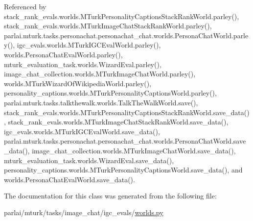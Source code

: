 Referenced by stack\+\_\+rank\+\_\+evals.\+worlds.\+M\+Turk\+Personality\+Captions\+Stack\+Rank\+World.\+parley(), stack\+\_\+rank\+\_\+evals.\+worlds.\+M\+Turk\+Image\+Chat\+Stack\+Rank\+World.\+parley(), parlai.\+mturk.\+tasks.\+personachat.\+personachat\+\_\+chat.\+worlds.\+Persona\+Chat\+World.\+parley(), igc\+\_\+evals.\+worlds.\+M\+Turk\+I\+G\+C\+Eval\+World.\+parley(), worlds.\+Persona\+Chat\+Eval\+World.\+parley(), mturk\+\_\+evaluation\+\_\+task.\+worlds.\+Wizard\+Eval.\+parley(), image\+\_\+chat\+\_\+collection.\+worlds.\+M\+Turk\+Image\+Chat\+World.\+parley(), worlds.\+M\+Turk\+Wizard\+Of\+Wikipedia\+World.\+parley(), personality\+\_\+captions.\+worlds.\+M\+Turk\+Personality\+Captions\+World.\+parley(), parlai.\+mturk.\+tasks.\+talkthewalk.\+worlds.\+Talk\+The\+Walk\+World.\+save(), stack\+\_\+rank\+\_\+evals.\+worlds.\+M\+Turk\+Personality\+Captions\+Stack\+Rank\+World.\+save\+\_\+data(), stack\+\_\+rank\+\_\+evals.\+worlds.\+M\+Turk\+Image\+Chat\+Stack\+Rank\+World.\+save\+\_\+data(), igc\+\_\+evals.\+worlds.\+M\+Turk\+I\+G\+C\+Eval\+World.\+save\+\_\+data(), parlai.\+mturk.\+tasks.\+personachat.\+personachat\+\_\+chat.\+worlds.\+Persona\+Chat\+World.\+save\+\_\+data(), image\+\_\+chat\+\_\+collection.\+worlds.\+M\+Turk\+Image\+Chat\+World.\+save\+\_\+data(), mturk\+\_\+evaluation\+\_\+task.\+worlds.\+Wizard\+Eval.\+save\+\_\+data(), personality\+\_\+captions.\+worlds.\+M\+Turk\+Personality\+Captions\+World.\+save\+\_\+data(), and worlds.\+Persona\+Chat\+Eval\+World.\+save\+\_\+data().



The documentation for this class was generated from the following file\+:\begin{DoxyCompactItemize}
\item 
parlai/mturk/tasks/image\+\_\+chat/igc\+\_\+evals/\hyperlink{parlai_2mturk_2tasks_2image__chat_2igc__evals_2worlds_8py}{worlds.\+py}\end{DoxyCompactItemize}
